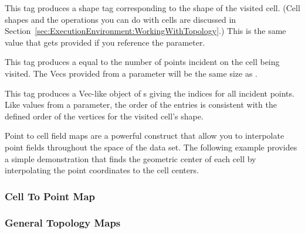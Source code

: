 \begin{description}
  \numericexecutionsignaturetags

\item[\sigtag{CellShape}] This tag produces a shape tag corresponding to
  the shape of the visited cell. (Cell shapes and the operations you can do
  with cells are discussed in
  Section~\ref{sec:ExecutionEnvironment:WorkingWithTopology}.) This is the
  same value that gets provided if you reference the
   parameter.

\item[\sigtag{PointCount}] This tag produces a  equal to
  the number of points incident on the cell being visited. The Vecs
  provided from a  parameter will be the same
  size as .

\item[\sigtag{PointIndices}] This tag produces a Vec-like object of
  s giving the indices for all incident points. Like values from a
   parameter, the order of the entries is
  consistent with the defined order of the vertices for the visited cell's
  shape.

  \commonexecutionsignaturetags
\end{description}

Point to cell field maps are a powerful construct that allow you to
interpolate point fields throughout the space of the data set. The
following example provides a simple demonstration that finds the geometric
center of each cell by interpolating the point coordinates to the cell
centers.



\subsubsection{Cell To Point Map}
\label{sec:WorkletMapCellToPoint}



\subsubsection{General Topology Maps}
\label{sec:WorkletMapTopology}

